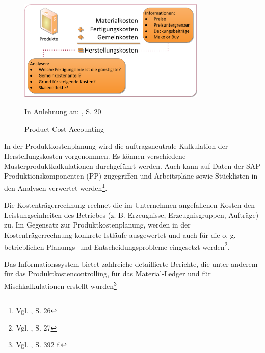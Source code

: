 \begin{figure}[htbp]
\begin{center}
\includegraphics[width=0.8\textwidth]{Images/produktkosten.png}

   {\footnotesize In Anlehnung an: \cite{SAPCOPCPCP2001}, S. 20}
   \caption[Product Cost Accounting]{Product Cost Accounting}\label{abb3}
\end{center}
\end{figure}\noindent
In der Produktkostenplanung wird die auftragsneutrale Kalkulation der Herstellungskosten vorgenommen. Es können verschiedene Musterproduktkalkulationen durchgeführt werden. Auch kann auf Daten der SAP Produktionskomponenten (PP) zugegriffen und Arbeitspläne sowie Stücklisten in den Analysen verwertet werden\footnote{Vgl. \cite{Friedl2008}, S. 26}.

Die Kostenträgerrechnung rechnet die im Unternehmen angefallenen Kosten den Leistungseinheiten des Betriebes (z. B. Erzeugnisse, Erzeugnisgruppen, Aufträge) zu. Im Gegensatz zur Produktkostenplanung, werden in der Kostenträgerrechnung konkrete Istläufe ausgewertet und auch für die o. g. betrieblichen Planungs- und Entscheidungsprobleme eingesetzt werden\footnote{Vgl. \cite{Friedl2008}, S. 27}.

Das Informationssystem bietet zahlreiche detaillierte Berichte, die unter anderem für das Produktkostencontrolling, für das Material-Ledger und für Mischkalkulationen erstellt wurden\footnote{Vgl. \cite{Patel2009}, S. 392 f.}



